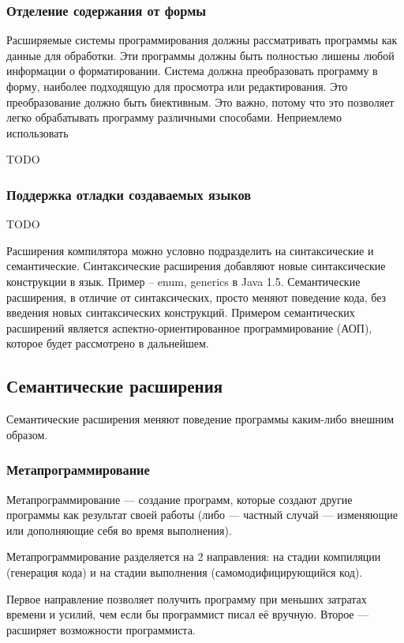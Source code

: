 \documentclass[a4paper,12pt]{article}
\begin{document}
\subsubsection{Отделение содержания от формы}
Расширяемые системы программирования должны рассматривать программы как данные
для обработки. Эти программы должны быть полностью лишены любой информации о
форматировании. Система должна преобразовать программу в форму, наиболее
подходящую для просмотра или редактирования. Это преобразование должно быть
биективным. Это важно, потому что это позволяет легко обрабатывать программу
различными способами. Неприемлемо использовать 

TODO

\subsubsection{Поддержка отладки создаваемых языков}
TODO

Расширения компилятора можно условно подразделить на синтаксические и
семантические. Синтаксические расширения добавляют новые синтаксические
конструкции в язык. Пример – enum, generics в Java 1.5. Семантические
расширения, в отличие от синтаксических, просто меняют поведение кода, без
введения новых синтаксических конструкций. Примером семантических расширений
является аспектно-ориентированное программирование (АОП), которое будет
рассмотрено в дальнейшем.

\subsection{Семантические расширения}

Семантические расширения меняют поведение программы каким-либо внешним образом.

\subsubsection{Метапрограммирование}
Метапрограммирование — создание программ, которые создают другие программы как
результат своей работы (либо — частный случай — изменяющие или дополняющие себя
во время выполнения).

Метапрограммирование разделяется на 2 направления: на стадии
компиляции (генерация кода) и на стадии выполнения (самомодифицирующийся код).

Первое направление позволяет получить программу при меньших затратах времени и
усилий, чем если бы программист писал её вручную. Второе — расширяет
возможности программиста.
\end{document}
